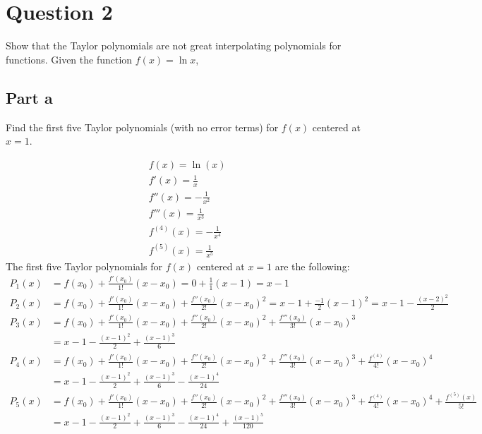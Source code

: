 \section{Question 2}

\begin{question}
    Show that the Taylor polynomials are not great interpolating polynomials for 
    functions. Given the function $f(x) = \ln x$,
\end{question}

\subsection{Part a}

\begin{question}
    Find the first five Taylor polynomials (with no error terms) for $f(x)$ centered at $x=1$.
\end{question}

\begin{answer}
    \begin{align}
        &f(x) = \ln{(x)}\\
        &f'(x) = \tfrac{1}{x}\\
        &f''(x) = -\tfrac{1}{x^2}\\
        &f'''(x) = \tfrac{1}{x^3}\\
        &f^{(4)}(x) = -\tfrac{1}{x^4}\\
        &f^{(5)}(x) = \tfrac{1}{x^5}
    \end{align}
    The first five Taylor polynomials for $f(x)$ centered at $x = 1$ are the following:
    \begin{align}
        P_1(x) &= f(x_0) + \tfrac{f'(x_0)}{1!}(x-x_0) = 0 + \tfrac{1}{1}(x-1) = x-1\\
        P_2(x) &= f(x_0) + \tfrac{f'(x_0)}{1!}(x-x_0) + \tfrac{f''(x_0)}{2!}{(x-x_0)}^2 = x-1+\tfrac{-1}{2}{(x-1)}^2 = x-1-\frac{{(x-2)}^2}{2}\\
        P_3(x) &= f(x_0) + \tfrac{f'(x_0)}{1!}(x-x_0) + \tfrac{f''(x_0)}{2!}{(x-x_0)}^2 + \tfrac{f'''(x_0)}{3!}{(x-x_0)}^3\\
        &= x-1-\tfrac{{(x-1)}^2}{2} + \tfrac{{(x-1)}^3}{6}\\
        P_4(x) &= f(x_0) + \tfrac{f'(x_0)}{1!}(x-x_0) + \tfrac{f''(x_0)}{2!}{(x-x_0)}^2 + \tfrac{f'''(x_0)}{3!}{(x-x_0)}^3 + \tfrac{f^{(4)}}{4!}{(x-x_0)}^4\\
        &= x-1-\tfrac{{(x-1)}^2}{2} + \tfrac{{(x-1)}^3}{6} - \tfrac{{(x-1)}^4}{24}\\
        P_5(x) &= f(x_0) + \tfrac{f'(x_0)}{1!}(x-x_0) + \tfrac{f''(x_0)}{2!}{(x-x_0)}^2 + \tfrac{f'''(x_0)}{3!}{(x-x_0)}^3 + \tfrac{f^{(4)}}{4!}{(x-x_0)}^4 + \tfrac{f^{(5)}(x)}{5!}\\
        &= x-1-\tfrac{{(x-1)}^2}{2} + \tfrac{{(x-1)}^3}{6} - \tfrac{{(x-1)}^4}{24} + \tfrac{{(x-1)}^5}{120}\\
    \end{align}
\end{answer}


